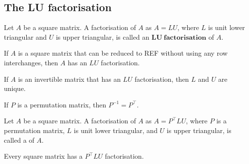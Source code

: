\documentclass{article}
\begin{document}
\subsection{The LU factorisation}
\begin{definition}
    Let $A$ be a square matrix. A factorisation of $A$ as $A=LU$, where $L$ is unit lower triangular and $U$ is upper triangular, is called an $\mathbf{LU\: factorisation}$ of $A$.
\end{definition}
\begin{theorem}
    If $A$ is a square matrix that can be reduced to REF without using any row interchanges, then $A$ has an $LU$ factorisation.
\end{theorem}
\begin{theorem}
    If $A$ is an invertible matrix that has an $LU$ factorisation, then $L$ and $U$ are unique.
\end{theorem}
\begin{theorem}
    If $P$ is a permutation matrix, then $P^{-1}=P^\intercal$.
\end{theorem}
\begin{definition}
    Let $A$ be a square matrix. A factorisation of $A$ as $A=P^\intercal LU$, where $P$ is a permutation matrix, $L$ is unit lower triangular, and $U$ is upper triangular, is called a  of $A$.
\end{definition}
\begin{theorem}
    Every square matrix has a $P^\intercal LU$ factorisation.
\end{theorem}
\end{document}
